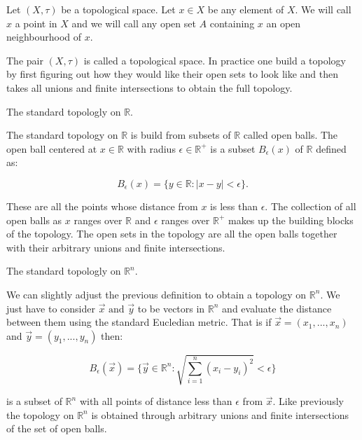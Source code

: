 \begin{defn} Let $(X, \tau)$ be a topological space. Let $x \in X$ be any element of $X$. We will call $x$ a point in $X$ and we will call any open set $A$ containing $x$ an open neighbourhood of $x$.  \end{defn}

The pair $(X, \tau)$ is called a topological space. In practice one build a topology by first figuring out how they would like their open sets to look like and then takes all unions and finite intersections to obtain the full topology.


\begin{ex} The standard topologly on $\mathbb{R}$.  \end{ex}

The standard topology on $\mathbb{R}$ is build from subsets of $\mathbb{R}$ called open balls. The open ball centered at $x \in \mathbb{R}$ with radius $\epsilon \in \mathbb{R}^+$ is a subset $B_\epsilon(x)$ of $\mathbb{R}$ defined as:

$$ B_\epsilon(x) = \{y \in \mathbb{R} : |x - y| < \epsilon \} .$$

These are all the points whose distance from $x$ is less than $\epsilon$. The collection of all open balls as $x$ ranges over $\mathbb{R}$ and $\epsilon$ ranges over $\mathbb{R}^+$ makes up the building blocks of the topology. The open sets in the topology are all the open balls together with their arbitrary unions and finite intersections.


\begin{ex} The standard topologly on $\mathbb{R}^n$.  \end{ex}

We can slightly adjust the previous definition to obtain a topology on $\mathbb{R}^n$. We just have to consider $\vec{x} \text{ and } \vec{y}$ to be vectors in $\mathbb{R}^n$ and evaluate the distance between them using the standard Eucledian metric. That is if $\vec{x} = (x_1, ..., x_n)$ and $\vec{y} = (y_1, ..., y_n)$ then:

$$ B_\epsilon(\vec{x}) = \{\vec{y} \in \mathbb{R}^n : \sqrt{\sum_{i = 1}^{n}{(x_i - y_i) ^ 2}} < \epsilon \} $$

is a subset of $\mathbb{R}^n$ with all points of distance less than $\epsilon$ from $\vec{x}$. Like previously the topology on $\mathbb{R}^n$ is obtained through arbitrary unions and finite intersections of the set of open balls.


